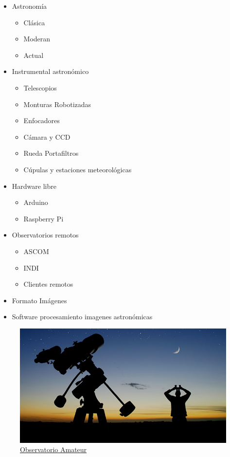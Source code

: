 \begin{itemize}
  \item {Astronomía}
   \begin{itemize}
	   \item{Clásica}
	   \item{Moderan}
	   \item{Actual}	 
	\end{itemize}

  \item {Instrumental astronómico}
  \begin{itemize}	
    \item{Telescopios}
    \item{Monturas Robotizadas}
    \item{Enfocadores}
    \item{Cámara y CCD}
    \item{Rueda Portafiltros}
    \item{Cúpulas y estaciones meteorológicas}
      
  \end{itemize}
  
  \item {Hardware libre}
   \begin{itemize}
     \item{Arduino}
     \item{Raspberry Pi}
   \end{itemize}
   
  \item {Observatorios remotos}
   \begin{itemize}
     \item{ASCOM}
     \item{INDI}
     \item{Clientes remotos}
  \end{itemize}
  
  \item{Formato Imágenes}
  \item {Software procesamiento imagenes astronómicas}

\end{itemize}


\begin{figure}[h]
\centering
\includegraphics[width=0.7\linewidth]{../images/observatorio_amateur}
\caption[Observatorio Amateur]{\href{http://astrocienciasecu.blogspot.com.es/}{Observatorio Amateur}}
\label{fig:observatorio_amateur}
\end{figure}
\newpage


